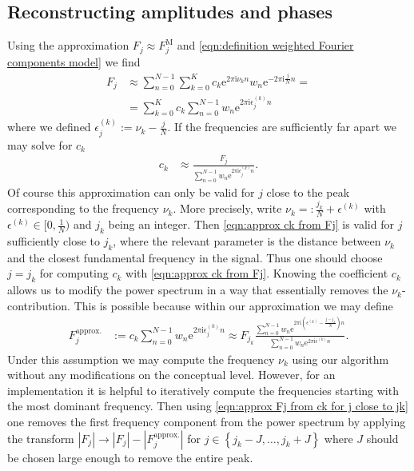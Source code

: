 \documentclass[english, parskip=full]{scrartcl}     %
\newcommand{\kla}{}
\newcommand{\klammer}{}
\newcommand{\tecxt}{}
\renewcommand{\i}{\text{i}}
\newcommand{\e}{\text{e}}
\begin{document}
\subsection{Reconstructing amplitudes and phases}
Using the approximation $F_j \approx F_j^\tecxt\text{M}$ and \autoref{eqn:definition weighted Fourier components model} we find
\begin{align}
F_j &\approx \sum_{n=0}^{N-1} \sum_{k=0}^K c_k \e^{2\pi\i \nu_k n} w_n \e^{-2\pi\i \frac{j}{N}n} = \\
&= \sum_{k=0}^K c_k \sum_{n=0}^{N-1} w_n \e^{2\pi\i \epsilon_j^{(k)} n}
\end{align}
where we defined $\epsilon_j^{(k)} := \nu_k - \frac{j}{N}$.
If the frequencies are sufficiently far apart we may solve for $c_k$
\begin{align}
c_k &\approx \frac{F_j}{\sum_{n=0}^{N-1} w_n \e^{2\pi\i \epsilon_j^{(k)} n }}. \label{eqn:approx ck from Fj}
\end{align}
Of course this approximation can only be valid for $j$ close to the peak corresponding to the frequency $\nu_k$.
More precisely, write $\nu_k =: \frac{j_k}{N} + \epsilon^{(k)}$ with $\epsilon^{(k)} \in [0, \frac{1}{N})$ and $j_k$ being an integer.
Then \autoref{eqn:approx ck from Fj} is valid for $j$ sufficiently close to $j_k$, where the relevant parameter is the distance between $\nu_k$ and the closest fundamental frequency in the signal.
Thus one should choose $j=j_k$ for computing $c_k$ with \autoref{eqn:approx ck from Fj}.
Knowing the coefficient $c_k$ allows us to modify the power spectrum in a way that essentially removes the $\nu_k$-contribution.
This is possible because within our approximation we may define
\begin{align}
F_j^\tecxt\text{approx.} &:= c_k \sum_{n=0}^{N-1} w_n \e^{2\pi\i \epsilon_j^{(k)} n} \approx F_{j_k} \frac{\sum_{n=0}^{N-1} w_n \e^{2\pi\i \kla\left( \epsilon^{(k)} - \frac{j - j_k}{N} \right)n}}{\sum_{n=0}^{N-1} w_n \e^{2\pi\i \epsilon^{(k)} n}}. \label{eqn:approx Fj from ck for j close to jk}
\end{align}
Under this assumption we may compute the frequency $\nu_k$ using our algorithm without any modifications on the conceptual level.
However, for an implementation it is helpful to iteratively compute the frequencies starting with the most dominant frequency.
Then using \autoref{eqn:approx Fj from ck for j close to jk} one removes the first frequency component from the power spectrum by applying the transform $|F_j| \rightarrow |F_j| - |F_j^\tecxt\text{approx.}|$ for $j\in \klammer\left\{ j_k - J, \dots, j_k + J \right\}$ where $J$ should be chosen large enough to remove the entire peak.
\end{document}
